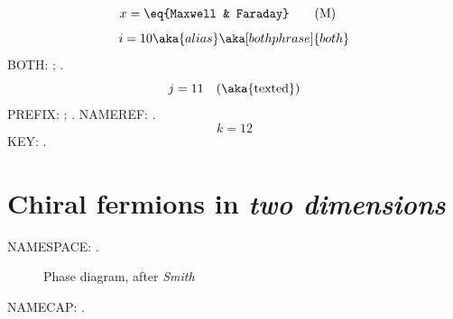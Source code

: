 \begin{align*} x &= \eq{Maxwell & Faraday} \tag{M} \end{align*}
\begin{equation} i=10 \aka{alias} \aka[both phrase]{both} \label{both} \end{equation}
BOTH: ; .
\begin{equation} j=11 \label{eq:prefixed} \quad\text{(\aka{texted})} \end{equation}
PREFIX: ; .
\ifdefined\nameref NAMEREF: .\fi
\begin{equation} k=12 \label{key} \end{equation}
KEY: .
\section{Chiral fermions in \emph{two dimensions}}
\ifdefined\nameref NAMESPACE: .\fi
\begin{figure}[h]\caption{Phase diagram, after \emph{Smith}}\end{figure}
\ifdefined\nameref NAMECAP: .\fi

